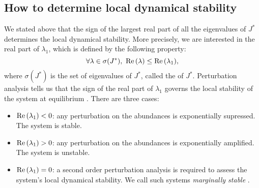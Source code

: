 \documentclass[12pt, titlepage]{report}
\begin{document}

\subsection{How to determine local dynamical stability}\label{sec : how to determine local dynamical stability}
We stated above that the sign of the largest real part of all the eigenvalues of $J^*$ determines the local dynamical stability.
More precisely, we are interested in the real part of $\lambda_1$, which is defined by the following property:
\begin{equation}
{\forall \lambda \in \sigma(J^*), \ \real{\lambda} \leq \real{\lambda_1}},
\end{equation}
where $\sigma(J^*)$ is the set of eigenvalues of $J^*$, called the  of $J^*$. Perturbation analysis tells us that the sign of the real part of $\lambda_1$ governs the local stability of the system at equilibrium \cite{strogatz_nonlinear_1994}. There are three cases:
\begin{itemize}
\item $\text{Re}\left(\lambda_1\right) < 0$: any perturbation on the abundances is exponentially supressed. The system is stable.
\item $\text{Re}\left(\lambda_1\right) > 0$: any perturbation on the abundances is exponentially amplified. The system is unstable.
\item $\text{Re}\left(\lambda_1\right)=0$: a second order perturbation analysis is required to assess the system's local dynamical stability. We call such systems \textit{marginally stable} \cite{biroli_marginally_2018}.
\end{itemize}
\end{document}
